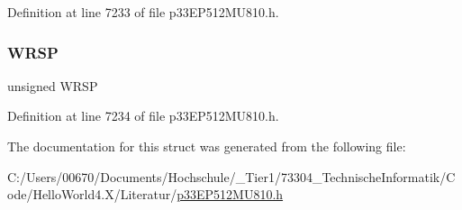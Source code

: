 Definition at line 7233 of file p33\+E\+P512\+M\+U810.\+h.

\mbox{\label{structtag_p_m_c_o_n_b_i_t_s_afd1312cdc689ece3410e033dc20575d7}} 
\subsubsection{\texorpdfstring{W\+R\+SP}{WRSP}}
{\footnotesize\ttfamily unsigned W\+R\+SP}



Definition at line 7234 of file p33\+E\+P512\+M\+U810.\+h.



The documentation for this struct was generated from the following file\+:\begin{DoxyCompactItemize}
\item 
C\+:/\+Users/00670/\+Documents/\+Hochschule/\+\_\+\+Tier1/73304\+\_\+\+Technische\+Informatik/\+Code/\+Hello\+World4.\+X/\+Literatur/\hyperlink{p33_e_p512_m_u810_8h}{p33\+E\+P512\+M\+U810.\+h}\end{DoxyCompactItemize}
